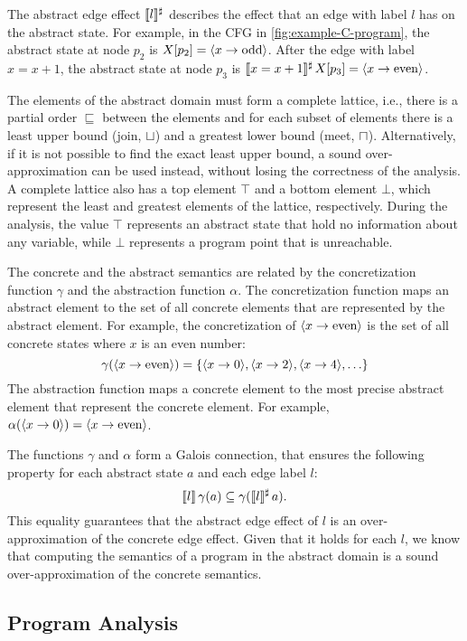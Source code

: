 The abstract edge effect $\llbracket l\rrbracket^\sharp$ describes the effect that an edge with label $l$ has on the abstract state.
For example, in the CFG in \cref{fig:example-C-program}, the abstract state at node $p_2$ is $X[p_2] = \langle x \rightarrow \text{odd}\rangle$.
After the edge with label $x = x+1$, the abstract state at node $p_3$ is $\llbracket x = x+1\rrbracket^\sharp\,X[p_3] = \langle x \rightarrow \text{even}\rangle$.

The elements of the abstract domain must form a complete lattice, i.e., there is a partial order $\sqsubseteq$ between the elements and for each subset of elements there is a least upper bound (join, $\sqcup$) and a greatest lower bound (meet, $\sqcap$).
Alternatively, if it is not possible to find the exact least upper bound, a sound over-approximation
can be used instead, without losing the correctness of the analysis.
A complete lattice also has a top element $\top$ and a bottom element $\bot$, which represent the least and greatest elements of the lattice, respectively.
During the analysis, the value $\top$ represents an abstract state that hold no information
about any variable, while $\bot$ represents a program point that is unreachable.

The concrete and the abstract semantics are related by the concretization function $\gamma$ and the abstraction function $\alpha$.
The concretization function maps an abstract element to the set of all concrete elements that are represented by the abstract element.
For example, the concretization of $\langle x \rightarrow \text{even}\rangle$ is the set of all concrete states where $x$ is an even number:
\[
\gamma(\langle x \rightarrow \text{even}\rangle) = \{\langle x \rightarrow 0\rangle, \langle x \rightarrow 2\rangle, \langle x \rightarrow 4\rangle,\ldots\}
\]
The abstraction function maps a concrete element to the most precise abstract element that represent the concrete element. For example, $\alpha(\langle x \rightarrow 0\rangle) = \langle x \rightarrow \text{even}\rangle$.

The functions $\gamma$ and $\alpha$ form a Galois connection, that ensures the following property for each abstract state $a$ and each edge label $l$:
\[
\llbracket l\rrbracket\,\gamma(a) \subseteq \gamma(\llbracket l\rrbracket^\sharp\,a).
\]
This equality guarantees that the abstract edge effect of $l$ is an over-approximation
of the concrete edge effect.
Given that it holds for each $l$, we know that computing the semantics of a program in the abstract domain is a sound
over-approximation of the concrete semantics.

\subsection{Program Analysis}

